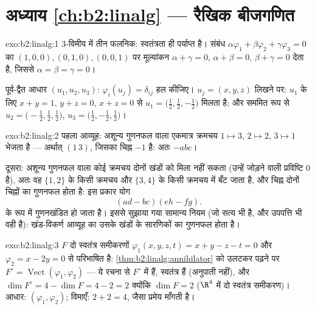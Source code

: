 \section*{अध्याय \ref{ch:b2:linalg} --- रैखिक बीजगणित}

\begin{solution}{exo:b2:linalg:1}
$3$-विमीय  में तीन फलनिक: स्वतंत्रता ही पर्याप्त है। संबंध $\alpha\varphi_1 + \beta\varphi_2 + \gamma\varphi_3 = 0$
का $(1,0,0), (0,1,0), (0,0,1)$ पर मूल्यांकन $\alpha + \gamma = 0$, $\alpha +
\beta = 0$, $\beta + \gamma = 0$ देता है, जिससे $\alpha = \beta = \gamma =
0$।

पूर्व-द्वैत आधार $(u_1, u_2, u_3)$: $\varphi_i(u_j) =
\delta_{ij}$ हल कीजिए। $u_j = (x, y, z)$ लिखने पर: $u_1$ के लिए $x + y = 1$,
$y + z = 0$, $x + z = 0$ से $u_1 = \bigl(\tfrac12, \tfrac12,
-\tfrac12\bigr)$ मिलता है; और सममित रूप से $u_2 = \bigl(-\tfrac12, \tfrac12,
\tfrac12\bigr)$, $u_3 = \bigl(\tfrac12, -\tfrac12, \tfrac12\bigr)$।
\end{solution}

\begin{solution}{exo:b2:linalg:2}
पहला आव्यूह: अशून्य गुणनफल वाला एकमात्र क्रमचय $1 \mapsto
3$, $2 \mapsto 2$, $3 \mapsto 1$ भेजता है
--- अर्थात्  $(1\,3)$, जिसका चिह्न $-1$ है: अतः  $-abc$।

दूसरा: अशून्य गुणनफल वाला कोई क्रमचय दोनों खंडों को मिला नहीं सकता
(उन्हें जोड़ने वाली प्रविष्टि $0$ है), अतः वह $\{1,2\}$ के किसी क्रमचय और
$\{3,4\}$ के किसी क्रमचय में बँट जाता है, और चिह्न दोनों चिह्नों का गुणनफल
होता है: इस प्रकार योग
\[
(ad - bc)(eh - fg) .
\]
के रूप में गुणनखंडित हो जाता है। इससे सुझाया गया सामान्य नियम (जो सत्य
भी है, और उपपत्ति भी वही है): खंड-विकर्ण आव्यूह का  उसके खंडों के
सारणिकों का गुणनफल होता है।
\end{solution}

\begin{solution}{exo:b2:linalg:3}
$F$ दो स्वतंत्र समीकरणों $\varphi_1(x,y,z,t)
= x + y - z - t = 0$ और $\varphi_2 = x - 2y = 0$ से परिभाषित है: \cref{thm:b2:linalg:annihilator} को उलटकर
पढ़ने पर $F^\circ =
\operatorname{Vect}(\varphi_1, \varphi_2)$ --- ये रचना से $F^\circ$ में हैं, स्वतंत्र हैं (अनुपाती नहीं),
और $\dim F^\circ
= 4 - \dim F = 4 - 2 = 2$ क्योंकि $\dim F = 2$ ($\R^4$ में दो स्वतंत्र समीकरण)। आधार: $(\varphi_1, \varphi_2)$; विमाएँ:
$2 + 2 = 4$, जैसा प्रमेय माँगती है।
\end{solution}

